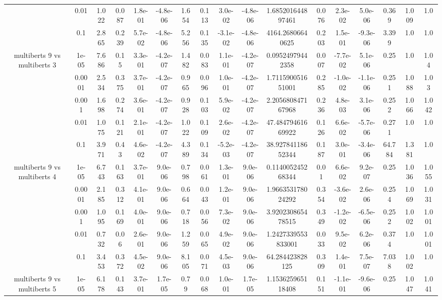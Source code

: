 \begin{tabular}{|c|c|c|c|c|c|c|c|c|c|c|c|c|c|c|c|c|}
 & 0.01 & 1.022 & 0.087 & 1.8e-01 & -4.8e-06 & 1.654 & 0.113 & 3.0e-02 & -4.8e-06 & 1.685201644897461 & 0.076 & 2.3e-02 & 5.0e-06 & 0.369 & 1.009 & 1.0 \\
 & 0.1 & 2.865 & 0.239 & 5.7e-02 & -4.8e-06 & 5.256 & 0.135 & -3.1e-02 & -4.8e-06 & 4164.26806640625 & 0.203 & 1.5e-01 & -9.3e-06 & 3.399 & 1.0 & 1.0 \\
\hline
\multirow{5}{*}{multiberts 9 vs multiberts 3} & 1e-05 & 7.686 & 0.15 & 3.3e-01 & -4.2e-07 & 1.482 & 0.083 & 1.1e-01 & -4.2e-07 & 0.09524979442358 & 0.007 & -7.7e-02 & 5.1e-06 & 0.25 & 1.0 & 1.04 \\
 & 0.0001 & 2.534 & 0.375 & 3.7e-01 & -4.2e-07 & 0.965 & 0.096 & 1.0e-01 & -4.2e-07 & 1.711590051651001 & 0.285 & -1.0e-02 & -1.1e-06 & 0.251 & 1.088 & 1.03 \\
 & 0.001 & 1.698 & 0.274 & 3.6e-01 & -4.2e-07 & 0.928 & 0.103 & 5.9e-02 & -4.2e-07 & 2.205680847167968 & 0.236 & 4.8e-03 & 3.1e-06 & 0.252 & 1.066 & 1.042 \\
 & 0.01 & 1.075 & 0.121 & 2.1e-01 & -4.2e-07 & 1.022 & 0.109 & 2.6e-02 & -4.2e-07 & 47.48479461669922 & 0.126 & 6.6e-02 & -5.7e-06 & 0.271 & 1.0 & 1.0 \\
 & 0.1 & 3.971 & 0.43 & 4.6e-02 & -4.2e-07 & 4.389 & 0.134 & -5.2e-03 & -4.2e-07 & 38.92784118652344 & 0.187 & 3.0e-01 & -3.4e-06 & 64.784 & 1.381 & 1.0 \\
\hline
\multirow{5}{*}{multiberts 9 vs multiberts 4} & 1e-05 & 6.743 & 0.163 & 3.7e-01 & 9.0e-06 & 0.798 & 0.061 & 1.3e-01 & 9.0e-06 & 0.114005245268344 & 0.01 & 6.6e-02 & 9.2e-07 & 0.25 & 1.036 & 1.055 \\
 & 0.0001 & 2.185 & 0.312 & 4.1e-01 & 9.0e-06 & 0.664 & 0.043 & 1.2e-01 & 9.0e-06 & 1.966353178024292 & 0.354 & -3.6e-02 & 2.6e-06 & 0.254 & 1.069 & 1.031 \\
 & 0.001 & 1.095 & 0.169 & 4.0e-01 & 9.0e-06 & 0.718 & 0.056 & 7.3e-02 & 9.0e-06 & 3.920230865478515 & 0.349 & -1.2e-02 & -6.5e-06 & 0.252 & 1.002 & 1.001 \\
 & 0.01 & 0.732 & 0.06 & 2.6e-01 & 9.0e-06 & 1.259 & 0.065 & 4.9e-02 & 9.0e-06 & 1.2427339553833001 & 0.033 & 9.5e-02 & 6.2e-06 & 0.374 & 1.0 & 1.001 \\
 & 0.1 & 3.453 & 0.372 & 4.5e-02 & 9.0e-06 & 8.105 & 0.071 & 4.5e-03 & 9.0e-06 & 64.284423828125 & 0.309 & 1.4e-01 & 7.5e-07 & 7.038 & 1.002 & 1.0 \\
\hline
\multirow{5}{*}{multiberts 9 vs multiberts 5} & 1e-05 & 6.178 & 0.143 & 3.7e-01 & 1.7e-05 & 0.79 & 0.068 & 1.0e-01 & 1.7e-05 & 1.153625965118408 & 0.151 & -1.1e-01 & -9.6e-06 & 0.25 & 1.047 & 1.041 \\

\end{tabular}
